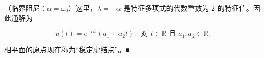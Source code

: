 \begin{example}

\begin{subitems}
\item[（iii）]

（临界阻尼：$ \alpha = \omega_{0} $）这里，$ \lambda = -\alpha $ 是特征多项式的代数重数为 2 的特征值。因此通解为

\[
u(t) = e^{-\alpha t}(a_{1} + a_{2}t) \quad \text{对 } t \in \mathbb{R} \text{ 且 } a_{1}, a_{2} \in \mathbb{R} .
\]

相平面的原点现在称为“稳定虚结点”。\nobreak\hspace{0.35em}■

\end{subitems}

\end{example}

\exerciseshead

